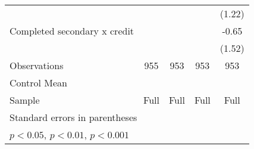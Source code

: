 {\begin{tabular}{l*{4}{c}}
                    &                     &                     &                     &      (1.22)         \\
[1em]
Completed secondary x credit&                     &                     &                     &       -0.65         \\
                    &                     &                     &                     &      (1.52)         \\
\hline
Observations        &         955         &         953         &         953         &         953         \\
Control Mean        &                     &                     &                     &                     \\
Sample              &        Full         &        Full         &        Full         &        Full         \\
\hline\hline
\multicolumn{5}{l}{\footnotesize Standard errors in parentheses}\\
\multicolumn{5}{l}{\footnotesize \sym{*} \(p<0.05\), \sym{**} \(p<0.01\), \sym{***} \(p<0.001\)}\\
\end{tabular}
}
